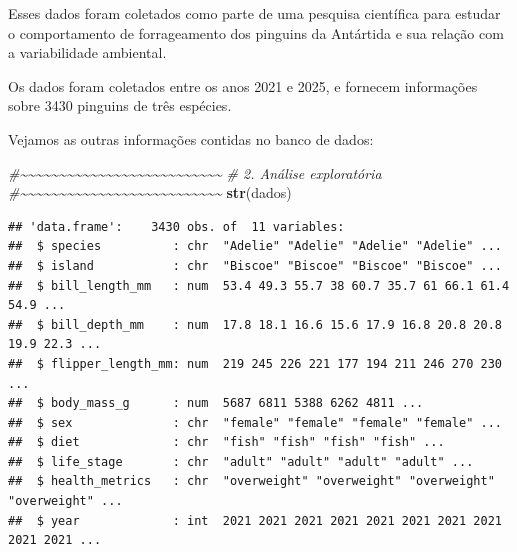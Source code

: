 \documentclass[
]{book}
\newenvironment{Shaded}{\begin{snugshade}}{\end{snugshade}}
\newcommand{\CommentTok}[1]{\textcolor[rgb]{0.56,0.35,0.01}{\textit{#1}}}
\newcommand{\FunctionTok}[1]{\textcolor[rgb]{0.13,0.29,0.53}{\textbf{#1}}}
\newcommand{\NormalTok}[1]{#1}
\begin{document}
Esses dados foram coletados como parte de uma pesquisa científica para estudar o comportamento de forrageamento dos pinguins da Antártida e sua relação com a variabilidade ambiental.

Os dados foram coletados entre os anos 2021 e 2025, e fornecem informações sobre 3430 pinguins de três espécies.

Vejamos as outras informações contidas no banco de dados:

\begin{Shaded}
\begin{Highlighting}[]
\CommentTok{\#\textasciitilde{}\textasciitilde{}\textasciitilde{}\textasciitilde{}\textasciitilde{}\textasciitilde{}\textasciitilde{}\textasciitilde{}\textasciitilde{}\textasciitilde{}\textasciitilde{}\textasciitilde{}\textasciitilde{}\textasciitilde{}\textasciitilde{}\textasciitilde{}\textasciitilde{}\textasciitilde{}\textasciitilde{}\textasciitilde{}\textasciitilde{}\textasciitilde{}\textasciitilde{}\textasciitilde{}\textasciitilde{}\textasciitilde{}}
\CommentTok{\# 2. Análise exploratória }
\CommentTok{\#\textasciitilde{}\textasciitilde{}\textasciitilde{}\textasciitilde{}\textasciitilde{}\textasciitilde{}\textasciitilde{}\textasciitilde{}\textasciitilde{}\textasciitilde{}\textasciitilde{}\textasciitilde{}\textasciitilde{}\textasciitilde{}\textasciitilde{}\textasciitilde{}\textasciitilde{}\textasciitilde{}\textasciitilde{}\textasciitilde{}\textasciitilde{}\textasciitilde{}\textasciitilde{}\textasciitilde{}\textasciitilde{}\textasciitilde{}}
\FunctionTok{str}\NormalTok{(dados)}
\end{Highlighting}
\end{Shaded}

\begin{verbatim}
## 'data.frame':    3430 obs. of  11 variables:
##  $ species          : chr  "Adelie" "Adelie" "Adelie" "Adelie" ...
##  $ island           : chr  "Biscoe" "Biscoe" "Biscoe" "Biscoe" ...
##  $ bill_length_mm   : num  53.4 49.3 55.7 38 60.7 35.7 61 66.1 61.4 54.9 ...
##  $ bill_depth_mm    : num  17.8 18.1 16.6 15.6 17.9 16.8 20.8 20.8 19.9 22.3 ...
##  $ flipper_length_mm: num  219 245 226 221 177 194 211 246 270 230 ...
##  $ body_mass_g      : num  5687 6811 5388 6262 4811 ...
##  $ sex              : chr  "female" "female" "female" "female" ...
##  $ diet             : chr  "fish" "fish" "fish" "fish" ...
##  $ life_stage       : chr  "adult" "adult" "adult" "adult" ...
##  $ health_metrics   : chr  "overweight" "overweight" "overweight" "overweight" ...
##  $ year             : int  2021 2021 2021 2021 2021 2021 2021 2021 2021 2021 ...
\end{verbatim}
\end{document}
